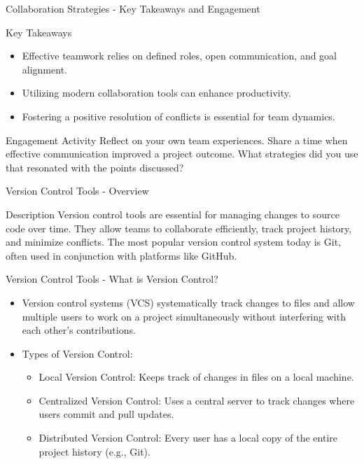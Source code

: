 \documentclass[aspectratio=169]{beamer}
\begin{document}
\begin{frame}[fragile]{Collaboration Strategies - Key Takeaways and Engagement}
  \begin{block}{Key Takeaways}
    \begin{itemize}
      \item Effective teamwork relies on defined roles, open communication, and goal alignment.
      \item Utilizing modern collaboration tools can enhance productivity.
      \item Fostering a positive resolution of conflicts is essential for team dynamics.
    \end{itemize}
  \end{block}

  \begin{block}{Engagement Activity}
    Reflect on your own team experiences. Share a time when effective communication improved a project outcome. What strategies did you use that resonated with the points discussed?
  \end{block}
\end{frame}

\begin{frame}[fragile]{Version Control Tools - Overview}
  \begin{block}{Description}
    Version control tools are essential for managing changes to source code over time. They allow teams to collaborate efficiently, track project history, and minimize conflicts. The most popular version control system today is Git, often used in conjunction with platforms like GitHub.
  \end{block}
\end{frame}

\begin{frame}[fragile]{Version Control Tools - What is Version Control?}
  \begin{itemize}
    \item Version control systems (VCS) systematically track changes to files and allow multiple users to work on a project simultaneously without interfering with each other's contributions.
    \item Types of Version Control:
      \begin{itemize}
        \item Local Version Control: Keeps track of changes in files on a local machine.
        \item Centralized Version Control: Uses a central server to track changes where users commit and pull updates.
        \item Distributed Version Control: Every user has a local copy of the entire project history (e.g., Git).
      \end{itemize}
  \end{itemize}
\end{frame}
\end{document}
